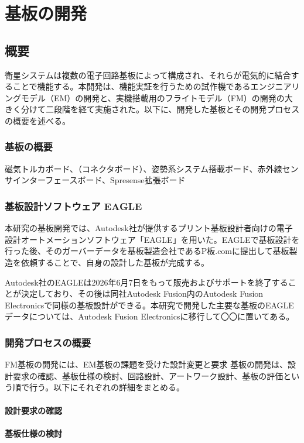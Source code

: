 \chapter{基板の開発}
\section{概要}
衛星システムは複数の電子回路基板によって構成され、それらが電気的に結合することで機能する。本開発は、機能実証を行うための試作機であるエンジニアリングモデル（EM）の開発と、実機搭載用のフライトモデル（FM）の開発の大きく分けて二段階を経て実施された。以下に、開発した基板とその開発プロセスの概要を述べる。

\subsection{基板の概要}
磁気トルカボード、（コネクタボード）、姿勢系システム搭載ボード、赤外線センサインターフェースボード、Spresense拡張ボード

\subsection{基板設計ソフトウェア EAGLE}
本研究の基板開発では、Autodesk社が提供するプリント基板設計者向けの電子設計オートメーションソフトウェア「EAGLE」を用いた。EAGLEで基板設計を行った後、そのガーバーデータを基板製造会社であるP板.comに提出して基板製造を依頼することで、自身の設計した基板が完成する。

Autodesk社のEAGLEは2026年6月7日をもって販売およびサポートを終了することが決定しており、その後は同社Autodesk Fusion内のAutodesk Fusion Electronicsで同様の基板設計ができる。本研究で開発した主要な基板のEAGLEデータについては、Autodesk Fusion Electronicsに移行して〇〇に置いてある。%

\subsection{開発プロセスの概要}
FM基板の開発には、EM基板の課題を受けた設計変更と要求
基板の開発は、設計要求の確認、基板仕様の検討、回路設計、アートワーク設計、基板の評価という順で行う。以下にそれぞれの詳細をまとめる。

\subsubsection{設計要求の確認}
\subsubsection{基板仕様の検討}
